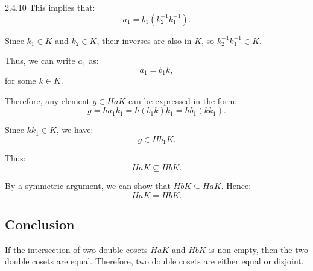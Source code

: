 \documentclass[12pt]{amsart}
\theoremstyle{definition}
\numberwithin{equation}{section}
\begin{document}
\begin{exercise}{2.4.10}
    This implies that:
    \[
    a_1 = b_1(k_2^{-1}k_1^{-1}).
    \]

    Since \(k_1 \in K\) and \(k_2 \in K\), their inverses are also in \(K\), so \(k_2^{-1}k_1^{-1} \in K\).

    Thus, we can write \(a_1\) as:
    \[
    a_1 = b_1k,
    \]
    for some \(k \in K\).

    Therefore, any element \(g \in HaK\) can be expressed in the form:
    \[
    g = ha_1k_1 = h(b_1k)k_1 = h b_1 (k k_1).
    \]

    Since \(k k_1 \in K\), we have:
    \[
    g \in Hb_1K.
    \]

    Thus:
    \[
    HaK \subseteq HbK.
    \]

    By a symmetric argument, we can show that \(HbK \subseteq HaK\). Hence:
    \[
    HaK = HbK.
    \]

    \subsection*{Conclusion}

    If the intersection of two double cosets \(HaK\) and \(HbK\) is non-empty, then the two double cosets are equal. Therefore, two double cosets are either equal or disjoint.

\end{exercise}
\newpage
\end{document}
